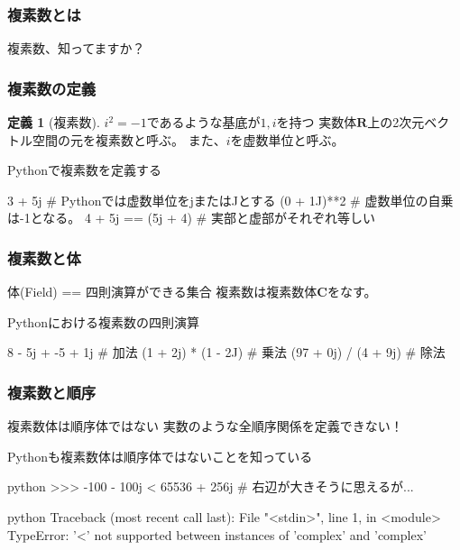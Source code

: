 \documentclass[dvipdfmx,11pt,notheorems]{beamer}
\theoremstyle{definition}
\newtheorem{definition}{定義}
\begin{document}
\begin{frame}\frametitle{複素数とは}

\begin{center}
\Huge{複素数、知ってますか？}
\end{center}

\end{frame}

\begin{frame}[fragile]\frametitle{複素数の定義}

\begin{definition}[複素数]
$i^{2}=-1$であるような基底が$1, i$を持つ
実数体$\mathbf{R}$上の2次元ベクトル空間の元を複素数と呼ぶ。
また、$i$を虚数単位と呼ぶ。
\end{definition}

\begin{exampleblock}{Pythonで複素数を定義する}
\begin{pyconsole}
3 + 5j # Pythonでは虚数単位をjまたはJとする
(0 + 1J)**2 # 虚数単位の自乗は-1となる。
4 + 5j == (5j + 4) # 実部と虚部がそれぞれ等しい
\end{pyconsole}
\end{exampleblock}

\end{frame}

\begin{frame}[fragile]\frametitle{複素数と体}

\begin{block}{体(Field) == 四則演算ができる集合}
複素数は複素数体$\mathbf{C}$をなす。
\end{block}

\begin{exampleblock}{Pythonにおける複素数の四則演算}
\begin{pyconsole}
8 - 5j + -5 + 1j # 加法
(1 + 2j) * (1 - 2J) # 乗法
(97 + 0j) / (4 + 9j) # 除法
\end{pyconsole}
\end{exampleblock}

\end{frame}

\begin{frame}[fragile]\frametitle{複素数と順序}
\begin{block}{複素数体は順序体ではない}
実数のような全順序関係を定義できない！
\end{block}

\begin{exampleblock}{Pythonも複素数体は順序体ではないことを知っている}
\begin{pygments}{python}
>>> -100 - 100j < 65536 + 256j # 右辺が大きそうに思えるが...
\end{pygments}
\begin{pygments}{python}
Traceback (most recent call last):
  File "<stdin>", line 1, in <module>
TypeError: '<' not supported between 
instances of 'complex' and 'complex'
\end{pygments}
\end{exampleblock}
\end{frame}
\end{document}
